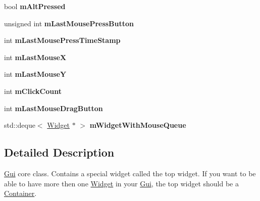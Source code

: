 \begin{DoxyCompactItemize}
\item 
bool {\bfseries m\+Alt\+Pressed}\hypertarget{classgcn_1_1Gui_a678962cf7e90a820660e37e36a020881}{}\label{classgcn_1_1Gui_a678962cf7e90a820660e37e36a020881}

\item 
unsigned int {\bfseries m\+Last\+Mouse\+Press\+Button}\hypertarget{classgcn_1_1Gui_ac2b85afc91a28d5e9b3b88c685b4e102}{}\label{classgcn_1_1Gui_ac2b85afc91a28d5e9b3b88c685b4e102}

\item 
int {\bfseries m\+Last\+Mouse\+Press\+Time\+Stamp}\hypertarget{classgcn_1_1Gui_acde4e38a2c4c1078ff88920b93167fb0}{}\label{classgcn_1_1Gui_acde4e38a2c4c1078ff88920b93167fb0}

\item 
int {\bfseries m\+Last\+MouseX}\hypertarget{classgcn_1_1Gui_a06bbfa9a446a238918ea21018e3b17a2}{}\label{classgcn_1_1Gui_a06bbfa9a446a238918ea21018e3b17a2}

\item 
int {\bfseries m\+Last\+MouseY}\hypertarget{classgcn_1_1Gui_a68df34ed2f71cdcff2b80f8deca645d4}{}\label{classgcn_1_1Gui_a68df34ed2f71cdcff2b80f8deca645d4}

\item 
int {\bfseries m\+Click\+Count}\hypertarget{classgcn_1_1Gui_ab08a032e0ec6b8cabed5dae39f5be9ce}{}\label{classgcn_1_1Gui_ab08a032e0ec6b8cabed5dae39f5be9ce}

\item 
int {\bfseries m\+Last\+Mouse\+Drag\+Button}\hypertarget{classgcn_1_1Gui_a2277fca30ae196ee34b231724454d268}{}\label{classgcn_1_1Gui_a2277fca30ae196ee34b231724454d268}

\item 
std\+::deque$<$ \hyperlink{classgcn_1_1Widget}{Widget} $\ast$ $>$ {\bfseries m\+Widget\+With\+Mouse\+Queue}\hypertarget{classgcn_1_1Gui_a0a6fc16b8724b80350742f05bf79aff1}{}\label{classgcn_1_1Gui_a0a6fc16b8724b80350742f05bf79aff1}

\end{DoxyCompactItemize}


\subsection{Detailed Description}
\hyperlink{classgcn_1_1Gui}{Gui} core class. Contains a special widget called the top widget. If you want to be able to have more then one \hyperlink{classgcn_1_1Widget}{Widget} in your \hyperlink{classgcn_1_1Gui}{Gui}, the top widget should be a \hyperlink{classgcn_1_1Container}{Container}.

